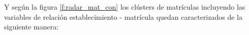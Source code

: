 
Y según la figura \ref{f:radar_mat_con} los clústers de matrículas incluyendo las variables de relación establecimiento - matrícula quedan caracterizados de la siguiente manera:

